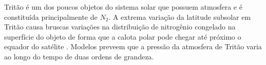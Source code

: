 \documentclass[12pt,a4paper]{report}
\begin{document}


Tritão é um dos poucos objetos do sistema solar que possuem atmosfera e é constituída principalmente de $N_{2}$. A extrema variação da latitude subsolar em Tritão causa bruscas variações na distribuição de nitrogênio congelado na superfície do objeto de forma que a calota polar pode chegar até próximo o equador do satélite \citep{Hansen1992}. Modelos preveem que a pressão da atmosfera de Tritão varia ao longo do tempo de duas ordens de grandeza.






\end{document}
